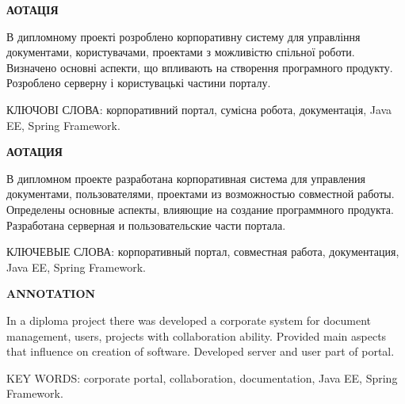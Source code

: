 \newpage
\begin{center}
\bf{АОТАЦІЯ}
\end{center}

\par В дипломному проекті розроблено корпоративну систему для управління документами, користувачами, проектами з можливістю спільної роботи. Визначено основні аспекти, що впливають на створення програмного продукту. Розроблено серверну і користувацькі частини порталу.
\vspace{10 mm}
\par КЛЮЧОВІ СЛОВА: корпоративний портал, сумісна робота, документація, Java EE, Spring Framework.

\newpage
\begin{center}
\bf{АОТАЦИЯ}
\end{center}

\par В дипломном проекте разработана корпоративная система для управления документами, пользователями, проектами из возможностью совместной работы. Определены основные аспекты, влияющие на создание программного продукта. Разработана серверная и пользовательские части портала.
\vspace{10 mm}
\par КЛЮЧЕВЫЕ СЛОВА: корпоративный портал, совместная работа, документация, Java EE, Spring Framework.


\newpage
\begin{center}
\bf{ANNOTATION}
\end{center}

\par In a diploma project there was developed a corporate system for document management, users, projects with collaboration ability. Provided main aspects that influence on creation of software. Developed server and user part of portal.
\vspace{10 mm}
\par KEY WORDS: corporate portal, collaboration, documentation, Java EE, Spring Framework.



